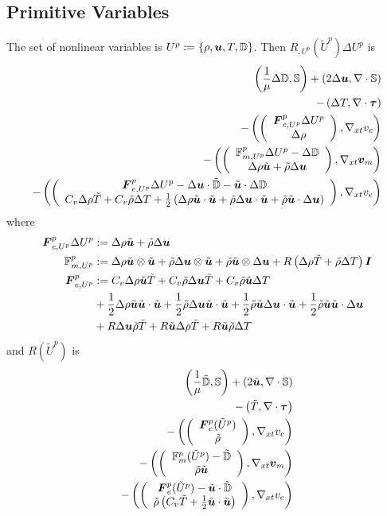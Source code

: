 \documentclass{article}
\begin{document}
\subsection*{Primitive Variables}
The set of nonlinear variables is $U^p:=\left\{ \rho,\boldsymbol u,T,\mathbb{D} \right\}$.
Then $R_{,U^p}(\tilde U^p)\Delta U^p$ is
\begin{align*}
	\left( \frac{1}{\mu}\Delta\mathbb{D},\mathbb{S} \right)+\left( 2\Delta\boldsymbol u,\nabla\cdot\mathbb{S} \right)\\
	-\left( \Delta T,\nabla\cdot\boldsymbol\tau \right)\\
	-\left( \left( \begin{array}{c} \boldsymbol F^p_{c,U^p}\Delta U^p\\ \Delta\rho\\ \end{array} \right),\nabla_{xt} v_c \right)\\
	-\left( \left( \begin{array}{c} \mathbb{F}^p_{m,U^p}\Delta U^p-\Delta\mathbb{D}\\ \Delta\rho\tilde{\boldsymbol u}+\tilde\rho\Delta\boldsymbol u\\ \end{array} \right),\nabla_{xt}\boldsymbol v_m \right)\\
	-\left( \left( \begin{array}{c} \boldsymbol F^p_{e,U^p}\Delta U^p-\Delta\boldsymbol u\cdot\tilde{\mathbb{D}}-\tilde{\boldsymbol u}\cdot\Delta\mathbb{D}\\ C_v\Delta\rho\tilde T+C_v\tilde\rho\Delta T
	+\frac{1}{2}\left( \Delta\rho\tilde{\boldsymbol u}\cdot\tilde{\boldsymbol u}+\tilde\rho\Delta\boldsymbol u\cdot\tilde{\boldsymbol u}+\tilde\rho\tilde{\boldsymbol u}\cdot\Delta\boldsymbol u \right)\\ \end{array} \right),\nabla_{xt} v_e \right)
\end{align*}
where
\begin{align*}
\boldsymbol F^p_{c,U^p}\Delta U^p&:=\Delta\rho\tilde{\boldsymbol u}+\tilde\rho\Delta\boldsymbol u\\
\mathbb{F}^p_{m,U^p}&:=\Delta\rho\tilde{\boldsymbol u}\otimes\tilde{\boldsymbol u}+\tilde\rho\Delta\boldsymbol u\otimes\tilde{\boldsymbol u}+\tilde\rho\tilde{\boldsymbol u}\otimes\Delta\boldsymbol u
+R\left( \Delta\rho\tilde T+\tilde\rho\Delta T \right)\boldsymbol I\\
\boldsymbol F^p_{e,U^p}&:=C_v\Delta\rho\tilde{\boldsymbol u}\tilde T+C_v\tilde\rho\Delta\boldsymbol u\tilde T+C_v\tilde\rho\tilde{\boldsymbol u}\Delta T\\
&+\frac{1}{2}\Delta\rho\tilde{\boldsymbol u}\tilde{\boldsymbol u}\cdot\tilde{\boldsymbol u}
+\frac{1}{2}\tilde\rho\Delta\boldsymbol u\tilde{\boldsymbol u}\cdot\tilde{\boldsymbol u}
+\frac{1}{2}\tilde\rho\tilde{\boldsymbol u}\Delta\boldsymbol u\cdot\tilde{\boldsymbol u}
+\frac{1}{2}\tilde\rho\tilde{\boldsymbol u}\tilde{\boldsymbol u}\cdot\Delta\boldsymbol u\\
&+R\Delta\boldsymbol u\tilde\rho\tilde T
+R\tilde{\boldsymbol u}\Delta\rho\tilde T
+R\tilde{\boldsymbol u}\tilde\rho\Delta T
\end{align*}
and $R(\tilde U^p)$ is
\begin{align*}
	\left( \frac{1}{\mu}\tilde{\mathbb{D}},\mathbb{S} \right)+\left( 2\tilde{\boldsymbol u},\nabla\cdot\mathbb{S} \right)\\
	-\left( \tilde T,\nabla\cdot\boldsymbol\tau \right)\\
	-\left( \left( \begin{array}{c} \boldsymbol F^p_c(\tilde U^p)\\ \tilde\rho\\ \end{array} \right),\nabla_{xt} v_c \right)\\
	-\left( \left( \begin{array}{c} \mathbb{F}^p_m(\tilde U^p)-\tilde{\mathbb{D}}\\ \tilde\rho\tilde{\boldsymbol u}\\ \end{array} \right),\nabla_{xt}\boldsymbol v_m \right)\\
	-\left( \left( \begin{array}{c} \boldsymbol F^p_e(\tilde U^p)-\tilde{\boldsymbol u}\cdot\tilde{\mathbb{D}}\\ \tilde\rho\left( C_v\tilde T+\frac{1}{2}\tilde{\boldsymbol u}\cdot\tilde{\boldsymbol u} \right)\\ \end{array} \right),\nabla_{xt} v_e \right)
\end{align*}
\end{document}
